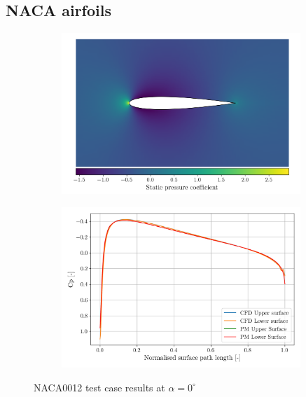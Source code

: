 \documentclass{article}
\begin{document}
\subsection{NACA airfoils}

\begin{figure}[H]
    \centering
    \begin{subfigure}{0.49\textwidth}
        \centering
        \includegraphics[width=0.99\textwidth]{figures/naca0012_cp.png}
        \caption{}
        \label{fig:naca0012_cp}
    \end{subfigure}
    \begin{subfigure}{0.49\textwidth}
        \centering
        \includegraphics[width=0.99\textwidth]{figures/naca0012_surface_cp_0.0.png}
        \caption{}
        \label{fig:naca0012_surface_cp}
    \end{subfigure}
    \caption{NACA0012 test case results at $\alpha = 0^\circ$}
\end{figure}
\end{document}
